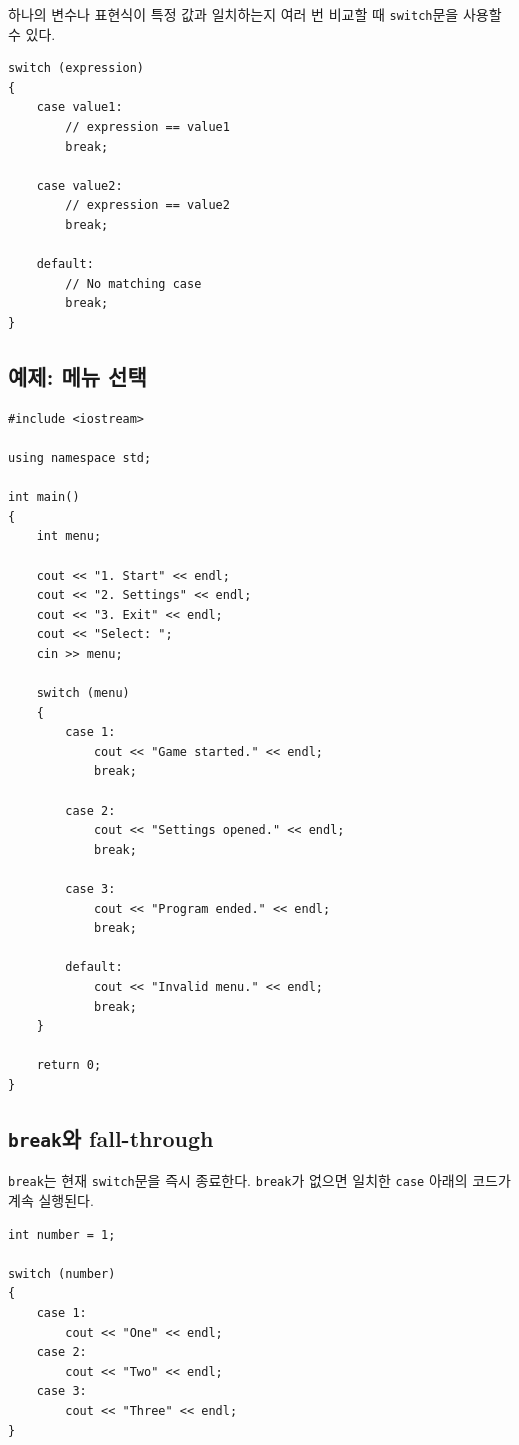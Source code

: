 \documentclass[11pt,a4paper]{article}
\begin{document}
하나의 변수나 표현식이 특정 값과 일치하는지 여러 번 비교할 때
\texttt{switch}문을 사용할 수 있다.

\begin{lstlisting}
switch (expression)
{
    case value1:
        // expression == value1
        break;

    case value2:
        // expression == value2
        break;

    default:
        // No matching case
        break;
}
\end{lstlisting}

\subsection{예제: 메뉴 선택}

\begin{lstlisting}
#include <iostream>

using namespace std;

int main()
{
    int menu;

    cout << "1. Start" << endl;
    cout << "2. Settings" << endl;
    cout << "3. Exit" << endl;
    cout << "Select: ";
    cin >> menu;

    switch (menu)
    {
        case 1:
            cout << "Game started." << endl;
            break;

        case 2:
            cout << "Settings opened." << endl;
            break;

        case 3:
            cout << "Program ended." << endl;
            break;

        default:
            cout << "Invalid menu." << endl;
            break;
    }

    return 0;
}
\end{lstlisting}

\subsection{\texttt{break}와 fall-through}

\texttt{break}는 현재 \texttt{switch}문을 즉시 종료한다.
\texttt{break}가 없으면 일치한 \texttt{case} 아래의 코드가 계속 실행된다.

\begin{lstlisting}
int number = 1;

switch (number)
{
    case 1:
        cout << "One" << endl;
    case 2:
        cout << "Two" << endl;
    case 3:
        cout << "Three" << endl;
}
\end{lstlisting}
\end{document}
